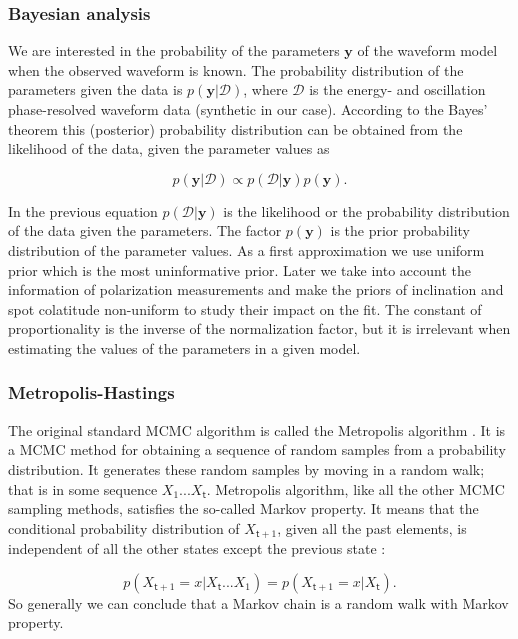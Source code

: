 \documentclass{wihuri}
\def\be{\begin{equation}}
\def\ee{\end{equation}}
\def\tstep{\mathsf{t}}
\begin{document}
\subsubsection{Bayesian analysis}

We are interested in the probability of the parameters $\textbf{y}$ of the waveform model when the observed waveform is known. The probability distribution of the parameters given the data is $p(\textbf{y}|\mathcal{D})$, where $\mathcal{D}$ is the energy- and oscillation phase-resolved waveform data (synthetic in our case). According to the Bayes' theorem this (posterior) probability distribution can be obtained from the likelihood of the data, given the parameter values as \cite{nattila_bayes}


\be \label{eq:bayes}
p(\textbf{y}|\mathcal{D}) \propto p(\mathcal{D}|\textbf{y})p(\textbf{y}).
\ee

In the previous equation $p(\mathcal{D}|\textbf{y})$ is the likelihood or the probability distribution of the data given the parameters. The factor $p(\textbf{y})$ is the prior probability distribution of the parameter values. As a first approximation we use uniform prior which is the most uninformative prior. Later we take into account the information of polarization measurements and make the priors of inclination and spot colatitude non-uniform to study their impact on the fit. The constant of proportionality is the inverse of the normalization factor, but it is irrelevant when estimating the values of the parameters in a given model. 


\subsubsection{Metropolis-Hastings}

The original standard MCMC algorithm is called the Metropolis algorithm \cite{metropolis53}\cite{hastings70}. %
It is a MCMC method for obtaining a sequence of random samples from a probability distribution. It generates these random samples by moving in a random walk; that is in some sequence $X_{1}...X_{\tstep}$. Metropolis algorithm, like all the other MCMC sampling methods, satisfies the so-called Markov property. It means that the conditional probability distribution of $X_{\tstep+1}$, given all the past elements, is independent of all the other states except the previous state \cite{kaiser}:

 \be \label{eq:markov_prop}
p(X_{\tstep +1} = x|X_{\tstep}. . . X_{1}) = p(X_{\tstep +1} = x|X_{\tstep}).
\ee
So generally we can conclude that a Markov chain is a random walk with Markov property.
 
\end{document}
